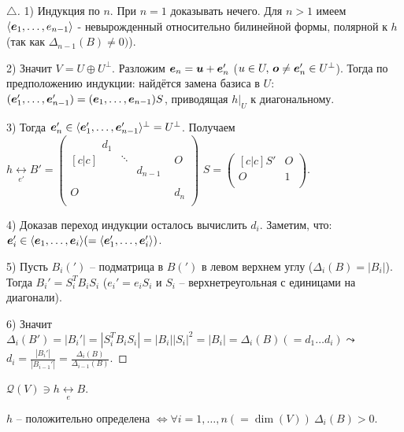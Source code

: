 \begin{proof}[$\triangle$]
	1) Индукция по $n$. При $n =1$ доказывать нечего. Для $n >1$ имеем $\langle \mbox{\boldmath $e$}_1,\ldots,e_{n-1}\rangle$ - невырожденный относительно билинейной формы, полярной к $h$ (так как $\Delta_{n-1}(B) \neq 0)$).

	2) Значит $V = U \oplus U^\bot$. Разложим $\mbox{\boldmath $e$}_n = \mbox{\boldmath $u$} + \mbox{\boldmath $e$}_n'$ ($u \in U,\, \mbox{\boldmath $o$} \neq \mbox{\boldmath $e$}_n' \in U^\bot$). 
	Тогда по предположению индукции: найдётся замена базиса в $U$: $(\mbox{\boldmath $e$}_1',\ldots,\mbox{\boldmath $e$}_{n-1}') = (\mbox{\boldmath $e$}_1,\ldots,\mbox{\boldmath $e$}_{n-1}) S$, приводящая $h \big|_U$ к диагональному.

	3) Тогда $\mbox{\boldmath $e$}_n' \in \langle \mbox{\boldmath $e$}_1',\ldots, \mbox{\boldmath $e$}_{n-1}'\rangle^\bot = U^\bot$. Получаем $h \underset{e'}{\longleftrightarrow} B' = 
	\begin{pmatrix}[c|c]
		\begin{matrix}d_1&&\\&\ddots&\\&&d_{n-1}\\ \end{matrix} & O\\
		\hline
		O & d_n\\
	\end{pmatrix}$
	$S = \begin{pmatrix}[c|c]
		S'&O\\
		\hline
		O&1\\
	\end{pmatrix}$.


	4) Доказав переход индукции осталось вычислить $d_i$. Заметим, что: $\mbox{\boldmath $e$}_i' \in \langle \mbox{\boldmath $e$}_1,\ldots,\mbox{\boldmath $e$}_i\rangle(=\langle \mbox{\boldmath $e$}_1',\ldots,\mbox{\boldmath $e$}_i'\rangle)$. 

	5) Пусть $B_i(')$ -- подматрица в $B(')$ в левом верхнем углу ($\Delta_i (B) = |B_i|$). Тогда $B_i' = S_i^T B_i S_i$ ($e_i' = e_i S_i$ и $S_i$ -- верхнетреугольная с единицами на диагонали).

	6) Значит $\Delta_i(B') = |B_i'| = |S_i^T B_i S_i| = |B_i| |S_i|^2 = |B_i| = \Delta_i(B) (= d_1 \ldots d_i) \leadsto$ $d_i = \frac{|B_i'|}{|B_{i-1}'|} = \frac{\Delta_i (B)}{\Delta_{i-1}(B)}$.
\end{proof}

\begin{to_thr}
	 $\mathcal{Q}(V) \ni h \underset{e}{\longleftrightarrow} B$.

	 $h$ -- положительно определена $\Longleftrightarrow \forall i = 1,\ldots,n(=\dim(V))\: \Delta_i(B) > 0$.
\end{to_thr}

